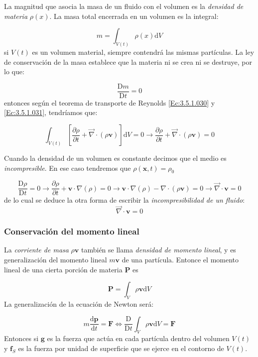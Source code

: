 \documentclass[12pt,a4paper]{article}
\numberwithin{equation}{section}
\numberwithin{figure}{section}
\newcommand{\parciales}[2]{\frac{\partial #1}{\partial #2}}
\newcommand{\ccorchetes}[1]{\left[ #1  \right]}
\newcommand{\D}{\mathrm{d}}
\newcommand{\Dd}{\mathrm{D}}
\newcommand{\vn}{\mathbf{v}}
\newcommand{\xn}{\mathbf{x}}
\newcommand{\Pn}{\mathbf{P}}
\newcommand{\pn}{\mathbf{p}}
\newcommand{\Fn}{\mathbf{F}}
\newcommand{\gn}{\mathbf{g}}
\newcommand{\fn}{\mathbf{f}}
\begin{document}
La magnitud que asocia la masa de un fluido con el volumen es la \textit{densidad de materia} $\rho (x)$. La masa total encerrada en un volumen es la integral:

\begin{equation}
m = \int_{V(t)} \rho (x) \D V
\end{equation}
si $V(t)$ es un volumen material, siempre contendrá las mismas partículas. La ley de conservación de la masa establece que la materia ni se crea ni se destruye, por lo que:

\begin{equation}
\dfrac{\Dd m}{\Dd t} = 0
\end{equation}
entonces según el teorema de transporte de Reynolds \ref{Ec:3.5.1.030} y \ref{Ec:3.5.1.031}, tendríamos que:

\begin{equation}
\int_{V(t)} \ccorchetes{\parciales{\rho}{t} + \vec{\nabla} \cdot (\rho \vn)} \D V = 0 \longrightarrow \parciales{\rho}{t} + \vec{\nabla} \cdot (\rho \vn) = 0  \label{Ec:3.6.1.036}
\end{equation}

Cuando la densidad de un volumen es constante decimos que el medio es \textit{incompresible}. En ese caso tendremos que $\rho (\xn,t) = \rho_0$

$$ \dfrac{\Dd \rho}{\Dd t} = 0 \longrightarrow \parciales{\rho}{t} + \vn \cdot \nabla (\rho) = 0 \longrightarrow \vn \cdot \nabla (\rho) - \nabla \cdot (\rho \vn) = 0  \longrightarrow \vec{\nabla} \cdot \vn = 0$$
de lo cual se deduce la otra forma de escribir la \textit{incompresibilidad de un fluido}:
\begin{equation}
\vec{\nabla} \cdot \vn = 0
\end{equation}

\subsubsection{Conservación del momento lineal}

La \textit{corriente de masa} $\rho \vn$ también se llama \textit{densidad de momento lineal}, y es generalización del momento lineal $m \vn$ de una partícula. Entonce el momento lineal de una cierta porción de materia $\Pn$ es

\begin{equation}
\Pn = \int_V \rho \vn \D V
\end{equation}
La generalización de la ecuación de Newton será:

\begin{equation}
m \dfrac{\D \pn}{\D t} = \Fn   \Longleftrightarrow \dfrac{\Dd}{\Dd t} \int_V \rho \vn \D V = \Fn
\end{equation}
Entonces si $\gn$ es la fuerza que actúa en cada partícula dentro del volumen $V(t)$ y $\fn_S$ es la fuerza por unidad de superficie que se ejerce en el contorno de $V(t)$. 
\end{document}
